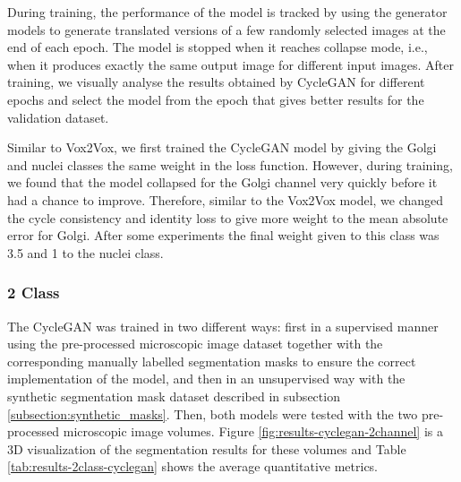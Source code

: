 During training, the performance of the model is tracked by using the generator models to generate translated versions of a few randomly selected images at the end of each epoch. The model is stopped when it reaches collapse mode, i.e., when it produces exactly the same output image for different input images. After training, we visually analyse the results obtained by CycleGAN for different epochs and select the model from the epoch that gives better results for the validation dataset.

Similar to Vox2Vox, we first trained the CycleGAN model by giving the Golgi and nuclei classes the same weight in the loss function. However, during training, we found that the model collapsed for the Golgi channel very quickly before it had a chance to improve. Therefore, similar to the Vox2Vox model, we changed the cycle consistency and identity loss to give more weight to the mean absolute error for Golgi. After some experiments the final weight given to this class was 3.5 and 1 to the nuclei class.


\subsubsection*{2 Class}

The CycleGAN was trained in two different ways: first in a supervised manner using the pre-processed microscopic image dataset together with the corresponding manually labelled segmentation masks to ensure the correct implementation of the model, and then in an unsupervised way with the synthetic segmentation mask dataset described in subsection \ref{subsection:synthetic_masks}. Then, both models were tested with the two pre-processed microscopic image volumes. Figure \ref{fig:results-cyclegan-2channel} is a \ac{3D} visualization of the segmentation results for these volumes and Table \ref{tab:results-2class-cyclegan} shows the average quantitative metrics.

\begin{table}[!htb]
\centering
\caption{Average metric values obtained from training the 2 class CycleGAN model in supervised and unsupervised way and testing these models on two pre-processed microscopic images}
\label{tab:results-2class-cyclegan}
\end{table}

